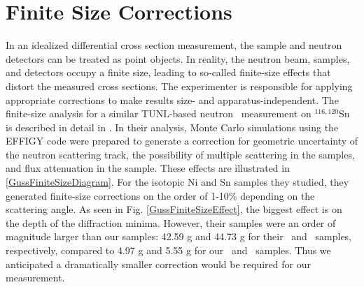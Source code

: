 \section{Finite Size Corrections}
In an idealized differential cross section measurement, the sample and neutron
detectors can be treated as point objects. In reality, the neutron beam,
samples, and detectors occupy a finite size, leading to so-called finite-size
effects that distort the measured cross sections. The experimenter is responsible
for applying appropriate corrections to make results size- and
apparatus-independent. The finite-size analysis for
a similar TUNL-based neutron \el\ measurement on $^{116,120}$Sn is described in detail
in \cite{GussPhDThesis}. In their analysis, Monte Carlo simulations using the
EFFIGY code were
prepared to generate a correction for geometric uncertainty of the neutron
scattering track, the possibility of multiple scattering
in the samples, and flux attenuation in the sample. These effects are illustrated in
\ref{GussFiniteSizeDiagram}.
For the isotopic Ni and Sn samples they studied, they generated finite-size
corrections on the order of 1-10\% depending on the scattering angle. As seen in
Fig. \ref{GussFiniteSizeEffect}, the
biggest effect is on the depth of the diffraction minima.
However, their samples
were an order of magnitude larger than our
samples: 42.59 g and 44.73 g for their \snSixteen\ and \snTwenty\ samples,
respectively, compared to 4.97 g and 5.55 g for our \snTwelve\ and \snFour\
samples. Thus we anticipated a dramatically smaller correction would be
required for our measurement.

